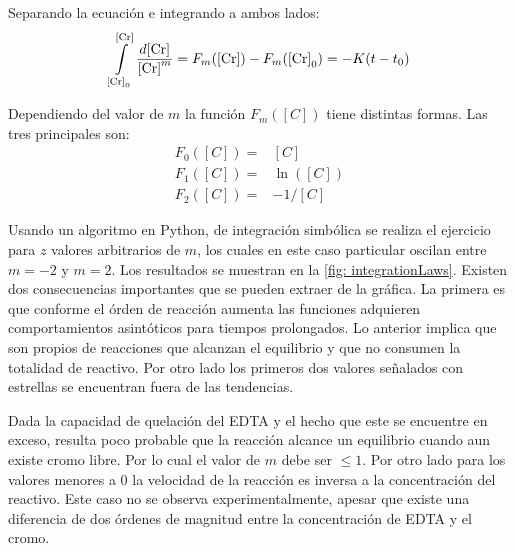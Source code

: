 \documentclass[fleqn,10pt]{SelfArx} %
\begin{document}
	Separando la ecuaci\'on e integrando a ambos lados:
	\begin{equation}
	    \int\limits_{\ce{[Cr]}_0}^{\ce{[Cr]}}\dfrac{d\ce{[Cr]}}{\ce{[Cr]}^m} = F_m(\ce{[Cr]}) - F_m(\ce{[Cr]}_0) = -K(t-t_0)
	\end{equation}
	
	Dependiendo del valor de $m$ la funci\'on $F_m([C])$ tiene distintas formas. Las tres principales son:
	\begin{equation*}
	    \begin{array}{cc}
	    F_0([C])= & [C] \\
	    F_1([C])= & \ln([C]) \\
	    F_2([C])= & -1/[C] 
	    \end{array}
	\end{equation*}
	
    Usando un algoritmo en Python, de integraci\'on simb\'olica se realiza el ejercicio para $z$ valores arbitrarios de $m$, los cuales en este caso particular oscilan entre $m=-2$ y $m=2$. Los resultados se muestran en la \autoref{fig: integrationLaws}. Existen dos consecuencias importantes que se pueden extraer de la gr\'afica. La primera es que conforme el \'orden de reacci\'on aumenta las funciones adquieren comportamientos asint\'oticos para tiempos prolongados. Lo anterior implica que son propios de reacciones que alcanzan el equilibrio y que no consumen la totalidad de reactivo. Por otro lado los primeros dos valores señalados con estrellas se encuentran fuera de las tendencias. 
    
    Dada la capacidad de quelaci\'on del EDTA y el hecho que este se encuentre en exceso, resulta poco probable que la reacci\'on alcance un equilibrio cuando aun existe cromo libre. Por lo cual el valor de $m$ debe ser $\leq 1$. Por otro lado para los valores menores a $0$ la velocidad de la reacci\'on es inversa a la concentraci\'on del reactivo. Este caso no se observa experimentalmente, apesar que existe una diferencia de dos \'ordenes de magnitud entre la concentraci\'on de EDTA y el cromo.
    
\end{document}
